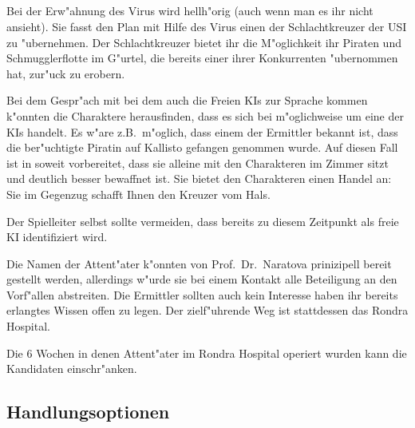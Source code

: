 \subsection{\xl{}}
Bei der Erw"ahnung des Virus wird \xl{} hellh"orig (auch wenn man es ihr nicht ansieht). Sie fasst den Plan mit Hilfe des Virus einen der Schlachtkreuzer der USI zu "ubernehmen. Der Schlachtkreuzer bietet ihr die M"oglichkeit ihr Piraten und Schmugglerflotte im G"urtel, die bereits einer ihrer Konkurrenten "ubernommen hat, zur"uck zu erobern.

Bei dem Gespr"ach mit \ml{} bei dem auch die Freien KIs zur Sprache kommen k"onnten die Charaktere herausfinden, dass es sich bei \xl{} m"oglichweise um eine der KIs handelt. Es w"are z.B.~m"oglich, dass einem der Ermittler bekannt ist, dass die ber"uchtigte Piratin auf Kallisto gefangen genommen wurde. Auf diesen Fall ist \xl{} in soweit vorbereitet, dass sie alleine mit den Charakteren im Zimmer sitzt und deutlich besser bewaffnet ist. Sie bietet den Charakteren einen Handel an: Sie im Gegenzug schafft Ihnen den Kreuzer vom Hals.

\begin{remarks}
	Der Spielleiter selbst sollte vermeiden, dass \xl{} bereits zu diesem Zeitpunkt als freie KI identifiziert wird.

	Die Namen der Attent"ater k"onnten von Prof.~Dr.~Naratova prinizipell bereit gestellt werden, allerdings w"urde sie bei einem Kontakt alle Beteiligung an den Vorf"allen abstreiten. Die Ermittler sollten auch kein Interesse haben ihr bereits erlangtes Wissen offen zu legen. Der zielf"uhrende Weg ist stattdessen das Rondra Hospital.

	Die 6 Wochen in denen Attent"ater im Rondra Hospital operiert wurden kann die Kandidaten einschr"anken.
\end{remarks}

\subsection{Handlungsoptionen}

